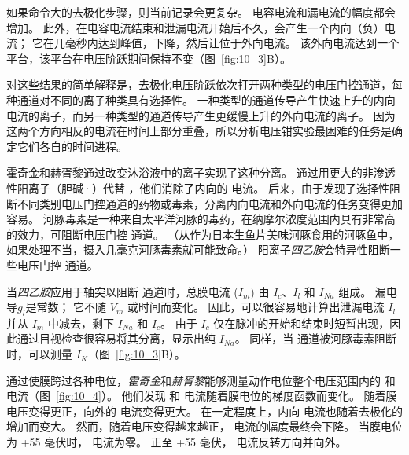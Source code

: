 如果命令大的去极化步骤，则当前记录会更复杂。
电容电流和漏电流的幅度都会增加。
此外，在电容电流结束和泄漏电流开始后不久，会产生一个内向（负）电流；
它在几毫秒内达到峰值，下降，然后让位于外向电流。
该外向电流达到一个平台，该平台在电压阶跃期间保持不变（图~\ref{fig:10_3}B）。


对这些结果的简单解释是，去极化电压阶跃依次打开两种类型的电压门控通道，每种通道对不同的离子种类具有选择性。
一种类型的通道传导产生快速上升的内向电流的离子，而另一种类型的通道传导产生更缓慢上升的外向电流的离子。
因为这两个方向相反的电流在时间上部分重叠，所以分析电压钳实验最困难的任务是确定它们各自的时间进程。


霍奇金和赫胥黎通过改变沐浴液中的离子实现了这种分离。
通过用更大的非渗透性阳离子（胆碱·）代替 ，他们消除了内向的  电流。
后来，由于发现了选择性阻断不同类别电压门控通道的药物或毒素，分离内向电流和外向电流的任务变得更加容易。
河豚毒素是一种来自太平洋河豚的毒药，在纳摩尔浓度范围内具有非常高的效力，可阻断电压门控  通道。
（从作为日本生鱼片美味河豚食用的河豚鱼中，如果处理不当，摄入几毫克河豚毒素就可能致命。）
阳离子\textit{四乙胺}会特异性阻断一些电压门控  通道。


当\textit{四乙胺}应用于轴突以阻断  通道时，总膜电流 ($I_m$) 由 $I_c$、$I_l$ 和 $I_{Na}$ 组成。
漏电导$g_l$是常数；
它不随 $V_m$ 或时间而变化。
因此，可以很容易地计算出泄漏电流 $I_l$ 并从 $I_m$ 中减去，剩下 $I_{Na}$ 和 $I_c$。
由于 $I_c$ 仅在脉冲的开始和结束时短暂出现，因此通过目视检查很容易将其分离，显示出纯 $I_{Na}$。
同样，当  通道被河豚毒素阻断时，可以测量 $I_K$（图~\ref{fig:10_3}B）。


通过使膜跨过各种电位，\textit{霍奇金}和\textit{赫胥黎}能够测量动作电位整个电压范围内的  和  电流（图~\ref{fig:10_4}）。
他们发现  和  电流随着膜电位的梯度函数而变化。
随着膜电压变得更正，向外的  电流变得更大。
在一定程度上，内向  电流也随着去极化的增加而变大。
然而，随着电压变得越来越正， 电流的幅度最终会下降。
当膜电位为 +55 毫伏时， 电流为零。
正至 +55 毫伏， 电流反转方向并向外。


